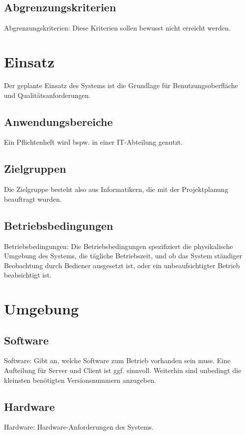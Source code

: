 \documentclass[a4paper]{scrreprt}
\begin{document}
\section{Abgrenzungskriterien}
Abgrenzungskriterien: Diese Kriterien sollen bewusst nicht erreicht werden.
 
\chapter{Einsatz}
Der geplante Einsatz des Systems ist die Grundlage für Benutzungsoberfläche und
Qualitätsanforderungen.
 
\section{Anwendungsbereiche}
Ein Pflichtenheft wird bspw. in einer IT-Abteilung genutzt.
 
\section{Zielgruppen}
Die Zielgruppe besteht also aus Informatikern, die mit der Projektplanung
beauftragt wurden.
 
\section{Betriebsbedingungen}
Betriebsbedingungen: Die Betriebsbedingungen spezifiziert die physikalische
Umgebung des Systems, die tägliche Betriebszeit, und ob das System ständiger
Beobachtung durch Bediener ausgesetzt ist, oder ein unbeaufsichtigter Betrieb
beabsichtigt ist.
 
\chapter{Umgebung}
 
\section{Software}
Software: Gibt an, welche Software zum Betrieb vorhanden sein muss. Eine
Aufteilung für Server und Client ist ggf. sinnvoll. Weiterhin sind unbedingt die
kleinsten benötigten Versionsnummern anzugeben.
 
\section{Hardware}
Hardware: Hardware-Anforderungen des Systems.
 
\end{document}
